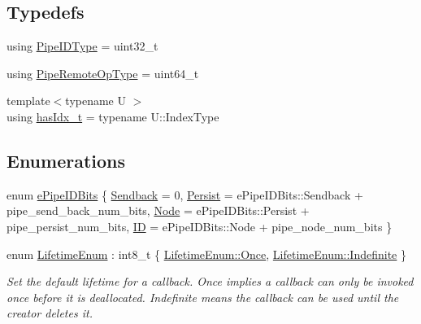 \subsection*{Typedefs}
\begin{DoxyCompactItemize}
\item 
using \hyperlink{namespacevt_1_1pipe_a8aa7908de242917ac0922b9e9c85fea4}{Pipe\+I\+D\+Type} = uint32\+\_\+t
\item 
using \hyperlink{namespacevt_1_1pipe_a9f156f00d06693969d89a230a38eab52}{Pipe\+Remote\+Op\+Type} = uint64\+\_\+t
\item 
{\footnotesize template$<$typename U $>$ }\\using \hyperlink{namespacevt_1_1pipe_aec0e0e0847f490cd0b05c6d4e61003e9}{has\+Idx\+\_\+t} = typename U\+::\+Index\+Type
\end{DoxyCompactItemize}
\subsection*{Enumerations}
\begin{DoxyCompactItemize}
\item 
enum \hyperlink{namespacevt_1_1pipe_a21eef17afd7b326e3b65894dffa25901}{e\+Pipe\+I\+D\+Bits} \{ \hyperlink{namespacevt_1_1pipe_a21eef17afd7b326e3b65894dffa25901aaac42b3fdd37e9218dbd0e436d89267d}{Sendback} = 0, 
\hyperlink{namespacevt_1_1pipe_a21eef17afd7b326e3b65894dffa25901ac18837aff5b91489fb6ecd1d654c9fe6}{Persist} = e\+Pipe\+I\+D\+Bits\+:\+:Sendback + pipe\+\_\+send\+\_\+back\+\_\+num\+\_\+bits, 
\hyperlink{namespacevt_1_1pipe_a21eef17afd7b326e3b65894dffa25901ac0c297204ed447f62890997c285e167f}{Node} = e\+Pipe\+I\+D\+Bits\+:\+:Persist + pipe\+\_\+persist\+\_\+num\+\_\+bits, 
\hyperlink{namespacevt_1_1pipe_a21eef17afd7b326e3b65894dffa25901af10f264d6f5a73d3ea0c79b74f383933}{ID} = e\+Pipe\+I\+D\+Bits\+:\+:Node + pipe\+\_\+node\+\_\+num\+\_\+bits
 \}
\item 
enum \hyperlink{namespacevt_1_1pipe_acb42b284378c0fdac1d7c6335dc26f58}{Lifetime\+Enum} \+: int8\+\_\+t \{ \hyperlink{namespacevt_1_1pipe_acb42b284378c0fdac1d7c6335dc26f58ae1a9dc9f23534e63de9df0d540ac1611}{Lifetime\+Enum\+::\+Once}, 
\hyperlink{namespacevt_1_1pipe_acb42b284378c0fdac1d7c6335dc26f58af55dbf14245df4e3c834b3edd8495b52}{Lifetime\+Enum\+::\+Indefinite}
 \}\begin{DoxyCompactList}\small\item\em Set the default lifetime for a callback. Once implies a callback can only be invoked once before it is deallocated. Indefinite means the callback can be used until the creator deletes it. \end{DoxyCompactList}
\end{DoxyCompactItemize}
